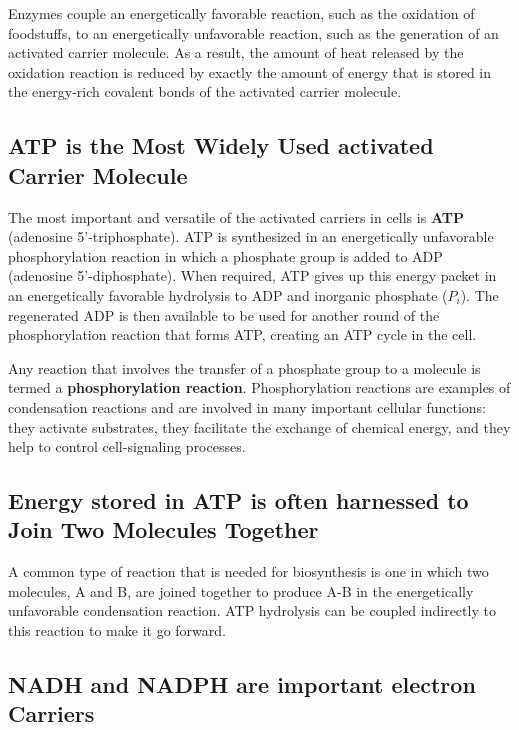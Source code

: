 Enzymes couple an energetically favorable reaction, such
as the oxidation of foodstuffs, to an energetically unfavorable reaction,
such as the generation of an activated carrier molecule. As a result, the
amount of heat released by the oxidation reaction is reduced
by exactly the amount of energy that is stored in the energy-rich covalent bonds
of the activated carrier molecule.

\subsection{ATP is the Most Widely Used activated Carrier Molecule}

The most important and versatile of the activated carriers in cells is
\textbf{ATP} (adenosine 5'-triphosphate). ATP is synthesized in an energetically unfavorable
phosphorylation reaction in which a phosphate group is added to ADP
(adenosine 5'-diphosphate).
When required, ATP gives up this energy
packet in an energetically favorable hydrolysis to ADP and inorganic
phosphate ($P_{i}$). The regenerated ADP is then available to be used for
another round of the phosphorylation reaction that forms ATP, creating
an ATP cycle in the cell.

Any reaction that involves the transfer of a phosphate group to a molecule is termed a
\textbf{phosphorylation reaction}. Phosphorylation reactions are examples of condensation reactions
and are involved in many important cellular functions: they
activate substrates, they facilitate the exchange of chemical energy, and
they help to control cell-signaling processes.

\subsection{Energy stored in ATP is often harnessed to Join Two Molecules Together}

A common type of reaction that is needed for biosynthesis is one in which
two molecules, A and B, are joined together to produce A-B in the energetically
unfavorable condensation reaction. ATP hydrolysis can be coupled indirectly to this
reaction to make it go forward.

\subsection{NADH and NADPH are important electron Carriers}

